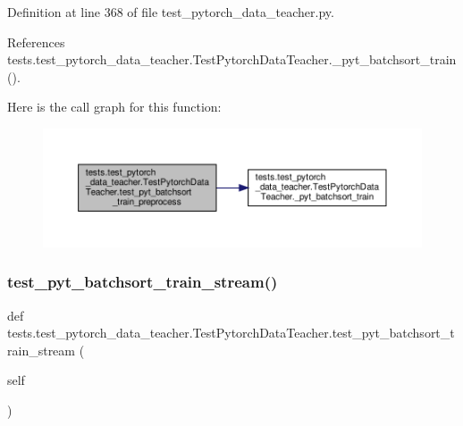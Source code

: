 Definition at line 368 of file test\+\_\+pytorch\+\_\+data\+\_\+teacher.\+py.



References tests.\+test\+\_\+pytorch\+\_\+data\+\_\+teacher.\+Test\+Pytorch\+Data\+Teacher.\+\_\+pyt\+\_\+batchsort\+\_\+train().

Here is the call graph for this function\+:
\nopagebreak
\begin{figure}[H]
\begin{center}
\leavevmode
\includegraphics[width=350pt]{classtests_1_1test__pytorch__data__teacher_1_1TestPytorchDataTeacher_acf2428b3226bc0cf95d4dbb80877e6d0_cgraph}
\end{center}
\end{figure}
\mbox{\label{classtests_1_1test__pytorch__data__teacher_1_1TestPytorchDataTeacher_a5db5cdee08adaaf60c646c7c884f1068}} 
\subsubsection{\texorpdfstring{test\+\_\+pyt\+\_\+batchsort\+\_\+train\+\_\+stream()}{test\_pyt\_batchsort\_train\_stream()}}
{\footnotesize\ttfamily def tests.\+test\+\_\+pytorch\+\_\+data\+\_\+teacher.\+Test\+Pytorch\+Data\+Teacher.\+test\+\_\+pyt\+\_\+batchsort\+\_\+train\+\_\+stream (\begin{DoxyParamCaption}\item[{}]{self }\end{DoxyParamCaption})}




